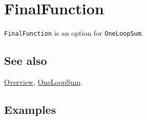 \documentclass[../FeynCalcManual.tex]{subfiles}
\begin{document}
\hypertarget{finalfunction}{
\section{FinalFunction}\label{finalfunction}}

\texttt{FinalFunction} is an option for \texttt{OneLoopSum}.

\subsection{See also}

\hyperlink{toc}{Overview}, \hyperlink{oneloopsum}{OneLoopSum}.

\subsection{Examples}
\end{document}
